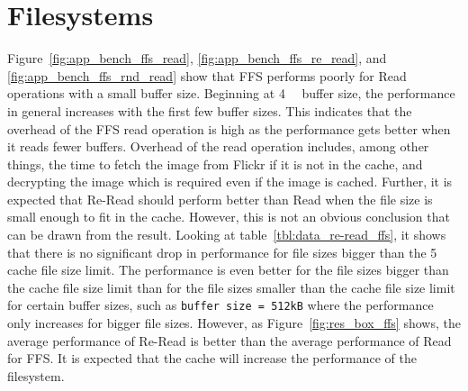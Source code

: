 \section{Filesystems}
\label{sec:dis_fs}
Figure~\ref{fig:app_bench_ffs_read}, \ref{fig:app_bench_ffs_re_read}, and \ref{fig:app_bench_ffs_rnd_read} show that \gls{FFS} performs poorly for Read operations with a small buffer size. Beginning at \SI{4}{\kilo\byte} buffer size, the performance in general increases with the first few buffer sizes. This indicates that the overhead of the \gls{FFS} read operation is high as the performance gets better when it reads fewer buffers. Overhead of the read operation includes, among other things, the time to fetch the image from Flickr if it is not in the cache, and decrypting the image which is required even if the image is cached. Further, it is expected that \mbox{Re-Read} should perform better than Read when the file size is small enough to fit in the cache. However, this is not an obvious conclusion that can be drawn from the result. Looking at table~\ref{tbl:data_re-read_ffs}, it shows that there is no significant drop in performance for file sizes bigger than the \SI{5}{\mega\byte} cache file size limit. The performance is even better for the file sizes bigger than the cache file size limit than for the file sizes smaller than the cache file size limit for certain buffer sizes, such as \texttt{buffer size = 512kB} where the performance only increases for bigger file sizes. However, as Figure~\ref{fig:res_box_ffs} shows, the average performance of \mbox{Re-Read} is better than the average performance of Read for \gls{FFS}. It is expected that the cache will increase the performance of the filesystem.

